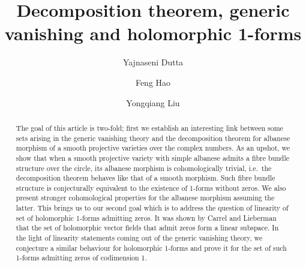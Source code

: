 \documentclass[12pt,reqno]{amsart}
\title{}
\theoremstyle{question}
\theoremstyle{definition}
\theoremstyle{remark}
\theoremstyle{cited}
\theoremstyle{citeddef}
\begin{document}
  
\title[Decomposition theorem, generic vanishing and holomorphic 1-forms]{Decomposition theorem, generic vanishing and holomorphic 1-forms} 

\author{Yajnaseni Dutta}


\author{Feng Hao}


\author{Yongqiang Liu}






\begin{abstract} 
The goal of this article is two-fold; first we establish an interesting link
between some sets arising in the generic vanishing theory and
the decomposition theorem for albanese morphism of a smooth projective varieties over the complex numbers. As an upshot, we show that when a smooth projective variety with simple albanese admits a fibre bundle structure over the circle, its albanese morphism is cohomologically trivial, i.e.\ the decomposition theorem behaves like that of a smooth morphism. Such fibre bundle structure is conjecturally equivalent to the existence of 1-forms without zeros. We also present stronger cohomological properties for the albanese morphism assuming the latter. This brings us to our second goal which is to address the question of linearity of set of holomorphic 1-forms
admitting zeros. It was shown by Carrel and Lieberman that the set of holomorphic vector fields that admit zeros form a linear subspace. In the light of linearity statements coming out of the generic vanishing theory, we conjecture a similar behaviour for holomorphic 1-forms and prove it for the set
of such 1-forms admitting zeros of codimension 1. 
\end{abstract}

\maketitle
\tableofcontents
\end{document}
